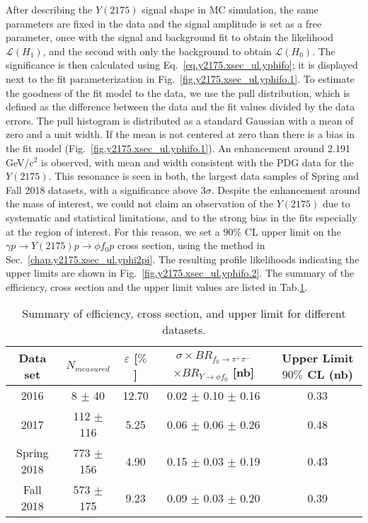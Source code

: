 After describing the $Y(2175)$ signal shape in MC simulation, the same parameters are fixed in the data and the signal amplitude is set as a free parameter, once with the signal and background fit to obtain the likelihood $\mathcal{L}(H_{1})$, and the second with only the background to obtain $\mathcal{L}(H_{0})$. The significance is then calculated using Eq.~\ref{eq.y2175.xsec_ul.yphifo}; it is displayed next to the fit parameterization in Fig.~\ref{fig.y2175.xsec_ul.yphifo.1}. To estimate the goodness of the fit model to the data, we use the pull distribution, which is defined as the difference between the data and the fit values divided by the data errors. The pull histogram is distributed as a standard Gaussian with a mean of zero and a unit width. If the mean is not centered at zero than there is a bias in the fit model (Fig.~\ref{fig.y2175.xsec_ul.yphifo.1}). An enhancement around 2.191 GeV/c$^2$ is observed, with mean and width consistent with the PDG data for the $Y(2175)$. This resonance is seen in both, the largest data samples of Spring and Fall 2018 datasets, with a significance above 3$\sigma$. Despite the enhancement around the mass of interest, we could not claim an observation of the $Y(2175)$ due to systematic and statistical limitations, and to the strong bias in the fits especially at the region of interest. For this reason, we set a $90\%$ CL upper limit on the $\gamma p \rightarrow Y(2175) p \rightarrow \phi f_0 p$ cross section, using the method in Sec.~\ref{chap.y2175.xsec_ul.yphi2pi}. The resulting profile likelihoods indicating the upper limits are shown in Fig.~\ref{fig.y2175.xsec_ul.yphifo.2}. The summary of the efficiency, cross section and the upper limit values are listed in Tab.\ref{tab.y2175.xsec_ul.yphifo}.

\begin{center}
    \null
    \vfill
    \begin{table}[htbp]
        \centering
        \caption{Summary of efficiency, cross section, and upper limit for different datasets.}
        \label{tab.y2175.xsec_ul.yphifo}
        \begin{tabular}{|c|c|c|c|c|}
            \hline
            Data set & $N_{measured}$ & $\varepsilon$ [$\%$] & $\sigma \times BR_{f_{0}\rightarrow\pi^{+}\pi^{-}}$ $\times BR_{Y\rightarrow \phi f_0}$ [nb] & \thead{Upper Limit\\$90\%$ CL (nb)}\\
            \hline
            2016 & 8 $\pm$ 40 & 12.70 & 0.02 $\pm$ 0.10 $\pm$ 0.16 & 0.33 \\
            2017 & 112 $\pm$ 116 & 5.25 & 0.06 $\pm$ 0.06 $\pm$ 0.26 & 0.48 \\
            Spring 2018 & 773 $\pm$ 156 & 4.90 & 0.15 $\pm$ 0.03 $\pm$ 0.19 & 0.43 \\
            Fall 2018 & 573 $\pm$ 175 & 9.23 & 0.09 $\pm$ 0.03 $\pm$ 0.20 & 0.39 \\
            \hline
        \end{tabular}
    \end{table}
    \null
    \vfill
\end{center}

